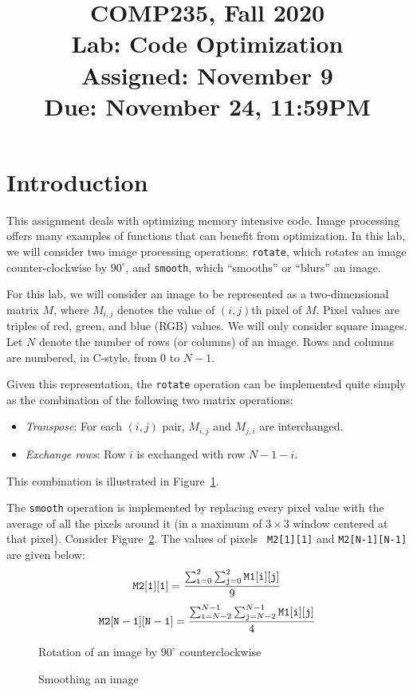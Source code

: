 \documentclass[11pt]{article}
\title{COMP235, Fall 2020\\
Lab: Code Optimization\\
Assigned: November 9 \\
Due: November 24, 11:59PM\\}
\author{}
\date{}
\begin{document}
\maketitle

\section{Introduction}
This assignment deals with optimizing memory intensive code.
Image processing offers many examples of functions that can benefit
from optimization. In this lab, we will consider two image processing
operations: {\tt rotate}, which rotates an image counter-clockwise by
$90^\circ$, and {\tt smooth}, which ``smooths'' or ``blurs'' an
image.

For this lab, we will consider an image to be represented as a
two-dimensional matrix $M$, where $M_{i,j}$ denotes the value of
$(i,j)$th pixel of $M$. Pixel values are triples of red, green, and
blue (RGB) values. We will only consider square images. Let $N$ denote
the number of rows (or columns) of an image. Rows and columns are
numbered, in C-style, from $0$ to $N-1$.

Given this representation, the {\tt rotate} operation can be
implemented quite simply as the combination of the following
two matrix operations:
\begin{itemize}
\item {\em Transpose}: For each $(i,j)$ pair,
$M_{i,j}$ and $M_{j,i}$ are interchanged.
\item {\em Exchange rows}: Row $i$ is exchanged with row $N-1-i$.
\end{itemize}
This combination is illustrated in Figure~\ref{fig:rotate}.

The {\tt smooth} operation is implemented by replacing every pixel
value with the average of all the pixels around it (in a maximum of
$3 \times 3$ window centered at that pixel).
Consider Figure~\ref{fig:smooth}. The values of pixels {\tt
M2[1][1]} and {\tt M2[N-1][N-1]} are given below:
$$ {\tt M2[1][1]} = \frac{\sum_{{\tt i}=0}^{2} \sum_{{\tt j}=0}^{2}
{\tt M1[i][j]}}{9} $$
$$ {\tt M2[N-1][N-1]} = \frac{\sum_{{\tt i}=N-2}^{N-1} \sum_{{\tt j}=N-2}^{N-1}
{\tt M1[i][j]}}{4} $$

\begin{figure}[htbp]
\centerline{}
\caption{Rotation of an image by $90^\circ$ counterclockwise}
\label{fig:rotate}
\end{figure}
\begin{figure}[htbp]
\centerline{}
\caption{Smoothing an image}
\label{fig:smooth}
\end{figure}
\end{document}
